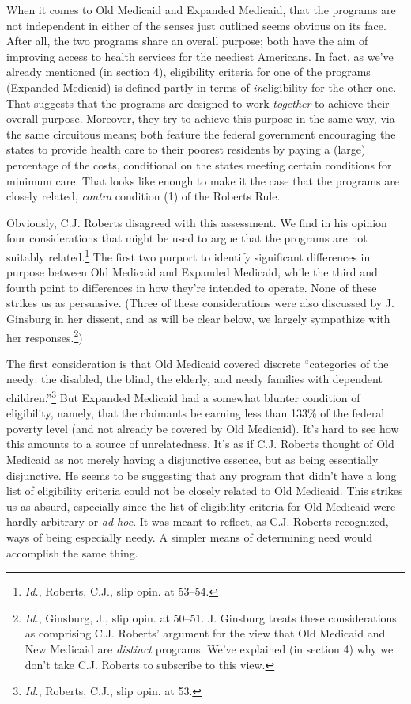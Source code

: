 When it comes to Old Medicaid and Expanded Medicaid, that the programs are not independent in either of the senses just outlined seems obvious on its face. After all, the two programs share an overall purpose; both have the aim of improving access to health services for the neediest Americans. In fact, as we've already mentioned (in section 4), eligibility criteria for one of the programs (Expanded Medicaid) is defined partly in terms of \emph{in}eligibility for the other one. That suggests that the programs are designed to work \emph{together} to achieve their overall purpose. Moreover, they try to achieve this purpose in the same way, via the same circuitous means; both feature the federal government encouraging the states to provide health care to their poorest residents by paying a (large) percentage of the costs, conditional on the states meeting certain conditions for minimum care. That looks like enough to make it the case that the programs are closely related, \emph{contra} condition (1) of the Roberts Rule.

Obviously, C.J. Roberts disagreed with this assessment. We find in his opinion four considerations that might be used to argue that the programs are not suitably related.\footnote{\emph{Id.}, Roberts, C.J., slip opin. at 53--54.} The first two purport to identify significant differences in purpose between Old Medicaid and Expanded Medicaid, while the third and fourth point to differences in how they're intended to operate. None of these strikes us as persuasive. (Three of these considerations were also discussed by J. Ginsburg in her dissent, and as will be clear below, we largely sympathize with her responses.\footnote{\emph{Id.}, Ginsburg, J., slip opin. at 50--51. J. Ginsburg treats these considerations as comprising C.J. Roberts' argument for the view that Old Medicaid and New Medicaid are \emph{distinct} programs. We've explained (in section 4) why we don't take C.J. Roberts to subscribe to this view.})

The first consideration is that Old Medicaid covered discrete ``categories of the needy: the disabled, the blind, the elderly, and needy families with dependent children.''\footnote{\emph{Id.}, Roberts, C.J., slip opin. at 53.} But Expanded Medicaid had a somewhat blunter condition of eligibility, namely, that the claimants be earning less than 133\% of the federal poverty level (and not already be covered by Old Medicaid). It's hard to see how this amounts to a source of unrelatedness. It's as if C.J. Roberts thought of Old Medicaid as not merely having a disjunctive essence, but as being essentially disjunctive. He seems to be suggesting that any program that didn't have a long list of eligibility criteria could not be closely related to Old Medicaid. This strikes us as absurd, especially since the list of eligibility criteria for Old Medicaid were hardly arbitrary or \emph{ad hoc}. It was meant to reflect, as C.J. Roberts recognized, ways of being especially needy. A simpler means of determining need would accomplish the same thing.

